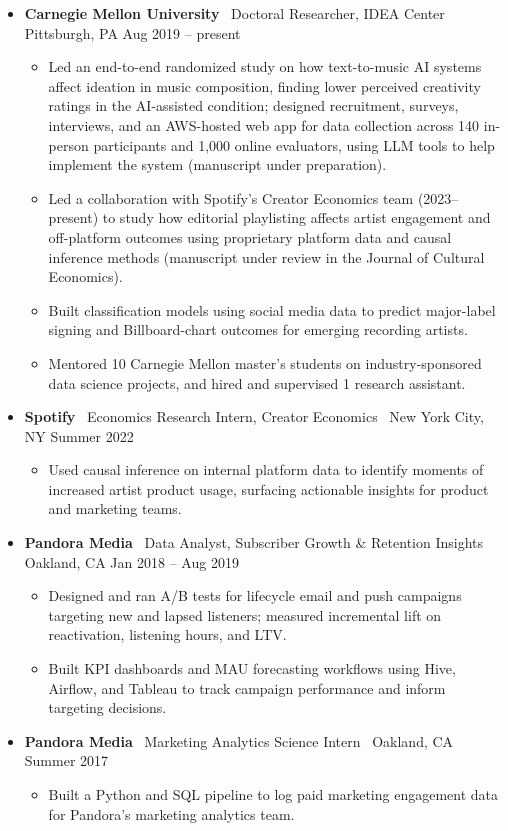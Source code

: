 \documentclass[10pt,letterpaper]{article}
\newcommand{\sep}{{\color{gray}\,\textbullet\,\,}}
\begin{document}
\begin{itemize}[leftmargin=0pt, label={}, itemsep=4pt]
\item \textbf{Carnegie Mellon University} \sep Doctoral Researcher, IDEA Center \sep Pittsburgh, PA \hfill Aug 2019 -- present
  \begin{itemize}
  \item Led an end-to-end randomized study on how text-to-music AI systems affect ideation in music composition, finding lower perceived creativity ratings in the AI-assisted condition; designed recruitment, surveys, interviews, and an AWS-hosted web app for data collection across 140 in-person participants and 1{,}000 online evaluators, using LLM tools to help implement the system (manuscript under preparation).
  \item Led a collaboration with Spotify's Creator Economics team (2023--present) to study how editorial playlisting affects artist engagement and off-platform outcomes using proprietary platform data and causal inference methods (manuscript under review in the Journal of Cultural Economics).
  \item Built classification models using social media data to predict major-label signing and Billboard-chart outcomes for emerging recording artists.
  \item Mentored 10 Carnegie Mellon master's students on industry-sponsored data science projects, and hired and supervised 1 research assistant.
  \end{itemize}
\item \textbf{Spotify} \sep Economics Research Intern, Creator Economics \sep New York City, NY \hfill Summer 2022
  \begin{itemize}
  \item Used causal inference on internal platform data to identify moments of increased artist product usage, surfacing actionable insights for product and marketing teams.
  \end{itemize}
\item \textbf{Pandora Media} \sep Data Analyst, Subscriber Growth \& Retention Insights \sep Oakland, CA \hfill Jan 2018 -- Aug 2019
  \begin{itemize}
  \item Designed and ran A/B tests for lifecycle email and push campaigns targeting new and lapsed listeners; measured incremental lift on reactivation, listening hours, and LTV.
  \item Built KPI dashboards and MAU forecasting workflows using Hive, Airflow, and Tableau to track campaign performance and inform targeting decisions.
  \end{itemize}
\item \textbf{Pandora Media} \sep Marketing Analytics Science Intern \sep Oakland, CA \hfill Summer 2017
  \begin{itemize}
  \item Built a Python and SQL pipeline to log paid marketing engagement data for Pandora's marketing analytics team.
  \end{itemize}
\end{itemize}
\end{document}

